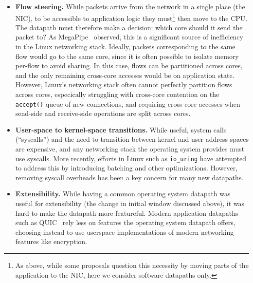 \begin{itemize}
    \item \textbf{Flow steering.} While packets arrive from the network in a single place (the NIC), to be accessible to application logic they must\footnote{As above, while some proposals question this necessity by moving parts of the application to the NIC, here we consider software datapaths only.} then move to the CPU. The datapath must therefore make a decision: which core should it send the packet to?
        As MegaPipe~\cite{megapipe} observed, this is a significant source of inefficiency in the Linux networking stack. Ideally, packets corresponding to the same flow would go to the same core, since it is often possible to isolate memory per-flow to avoid sharing. In this case, flows can be partitioned across cores, and the only remaining cross-core accesses would be on application state. 
        However, Linux's networking stack often cannot perfectly partition flows across cores, especically struggling with cross-core contention on the \texttt{accept()} queue of new connections, and requiring cross-core accesses when send-side and receive-side operations are split across cores.
    \item \textbf{User-space to kernel-space transitions.} While useful, system calls (``syscalls'') and the need to transition between kernel and user address spaces are expensive, and any networking stack the operating system provides must use syscalls. More recently, efforts in Linux such as \texttt{io\_uring} have attempted to address this by introducing batching and other optimizations. However, removing syscall overheads has been a key concern for many new datapaths.
    \item \textbf{Extensibility.} While having a common operating system datapath was useful for extensibility (\eg the change in initial window discussed above), it was hard to make the datapath more featureful. Modern application datapaths such as QUIC~\cite{quic} rely less on features the operating system datapath offers, choosing instead to use userspace implementations of modern networking features like encryption.
\end{itemize}

